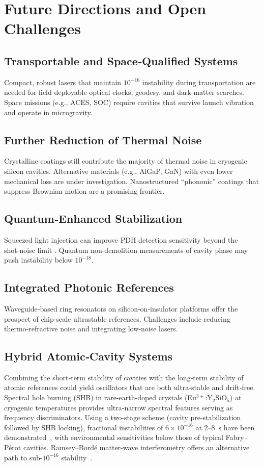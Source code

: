 \documentclass[12pt,a4paper]{article}
\begin{document}
\section{Future Directions and Open Challenges}\label{sec:future}
\subsection{Transportable and Space‑Qualified Systems}
Compact, robust lasers that maintain $10^{-16}$ instability during transportation are needed for field deployable optical clocks, geodesy, and dark‑matter searches. Space missions (e.g., ACES, SOC) require cavities that survive launch vibration and operate in microgravity.

\subsection{Further Reduction of Thermal Noise}
Crystalline coatings still contribute the majority of thermal noise in cryogenic silicon cavities. Alternative materials (e.g., AlGaP, GaN) with even lower mechanical loss are under investigation. Nanostructured ``phononic'' coatings that suppress Brownian motion are a promising frontier.

\subsection{Quantum‑Enhanced Stabilization}
Squeezed light injection can improve PDH detection sensitivity beyond the shot‑noise limit \cite{aasi2013}. Quantum non‑demolition measurements of cavity phase may push instability below $10^{-18}$.

\subsection{Integrated Photonic References}
Waveguide‑based ring resonators on silicon‑on‑insulator platforms offer the prospect of chip‑scale ultrastable references. Challenges include reducing thermo‑refractive noise and integrating low‑noise lasers.

\subsection{Hybrid Atomic‑Cavity Systems}
Combining the short‑term stability of cavities with the long‑term stability of atomic references could yield oscillators that are both ultra‑stable and drift‑free. Spectral hole burning (SHB) in rare-earth-doped crystals (Eu$^{3+}$:Y$_2$SiO$_5$) at cryogenic temperatures provides ultra-narrow spectral features serving as frequency discriminators. Using a two-stage scheme (cavity pre-stabilization followed by SHB locking), fractional instabilities of $6\times10^{-16}$ at 2–8~s have been demonstrated~\cite{thorpe2011}, with environmental sensitivities below those of typical Fabry–Pérot cavities. Ramsey–Bordé matter-wave interferometry offers an alternative path to sub-$10^{-16}$ stability~\cite{olson2019}.
\end{document}
